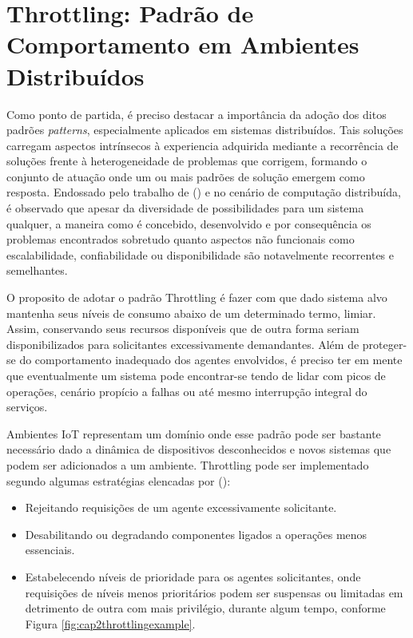 \section{Throttling: Padrão de Comportamento em Ambientes Distribuídos}
\label{cap2:throttling}

Como ponto de partida, é preciso destacar a importância da adoção dos ditos padrões \textit{patterns}, especialmente aplicados em sistemas distribuídos. Tais soluções carregam aspectos intrínsecos à experiencia adquirida mediante a recorrência de soluções frente à heterogeneidade de problemas que corrigem, formando o conjunto de atuação onde um ou mais padrões de solução emergem como resposta. Endossado pelo trabalho de \citeauthor{burns_designing_nodate} (\citeyear{burns_designing_nodate}) e no cenário de computação distribuída, é observado que apesar da diversidade de possibilidades para um sistema qualquer, a maneira como é concebido, desenvolvido e por consequência os problemas encontrados sobretudo quanto  aspectos não funcionais como escalabilidade, confiabilidade ou disponibilidade são notavelmente recorrentes e semelhantes. 

O proposito de adotar o padrão Throttling é fazer com que dado sistema alvo mantenha seus níveis de consumo abaixo de um determinado termo, limiar. Assim, conservando seus recursos disponíveis que de outra forma seriam disponibilizados para solicitantes excessivamente demandantes. Além de proteger-se do comportamento inadequado dos agentes envolvidos, é preciso ter em mente que eventualmente um sistema pode encontrar-se tendo de lidar com picos de operações, cenário propício a falhas ou até mesmo interrupção integral do serviços. 

Ambientes IoT representam um domínio onde esse padrão pode ser bastante necessário dado a dinâmica de dispositivos desconhecidos e novos sistemas que podem ser adicionados a um ambiente. Throttling pode ser implementado segundo algumas estratégias elencadas por \citeauthor{martinekuan_throttling_nodate} (\citeyear{martinekuan_throttling_nodate}):

\begin{itemize}
	\item Rejeitando requisições de um agente excessivamente solicitante.
	\item Desabilitando ou degradando componentes ligados a operações menos essenciais. 
	\item Estabelecendo níveis de prioridade para os agentes solicitantes, onde requisições de níveis menos prioritários podem ser suspensas ou limitadas em detrimento de outra com mais privilégio, durante algum tempo, conforme Figura \ref{fig:cap2throttlingexample}.
\end{itemize}

